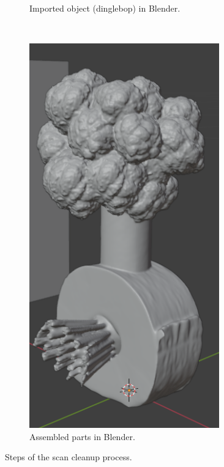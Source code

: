 \documentclass[12pt,a4paper]{article}
\begin{document}
\begin{figure}[h]
\begin{subfigure}[t]{0.4\linewidth}
    \caption{Imported object (dinglebop) in Blender.}
  \end{subfigure}
  ~
  \begin{subfigure}[t]{0.2\linewidth}
    \centering
    \includegraphics[width=0.9\textwidth]{media/blender_assembled.png}
    \caption{Assembled parts in Blender.}
  \end{subfigure}
  \caption{Steps of the scan cleanup process.}

\end{figure}
\end{document}
